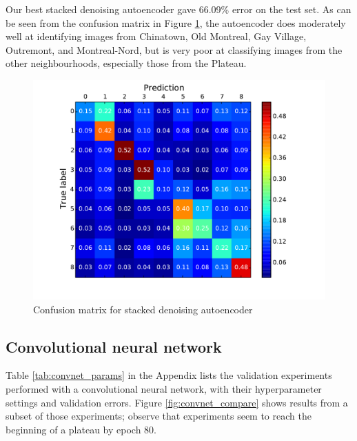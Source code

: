 \documentclass{acm_proc_article-sp}
\begin{document}
Our best stacked denoising autoencoder gave 66.09\% error on the test set. As can be seen from the confusion matrix in Figure \ref{fig:autoencoder_conf}, the autoencoder does moderately well at identifying images from Chinatown, Old Montreal, Gay Village, Outremont, and Montreal-Nord, but is very poor at classifying images from the other neighbourhoods, especially those from the Plateau.

\begin{figure}[h!]
\includegraphics[width=\linewidth]{autoencoder_confusion.pdf}
		\caption{Confusion matrix for stacked denoising autoencoder}
		\label{fig:autoencoder_conf}
\end{figure}

\subsection{Convolutional neural network}

Table \ref{tab:convnet_params} in the Appendix lists the validation experiments performed with a convolutional neural network, with their hyperparameter settings and validation errors. Figure \ref{fig:convnet_compare} shows results from a subset of those experiments; observe that experiments seem to reach the beginning of a plateau by epoch 80. 
\end{document}
